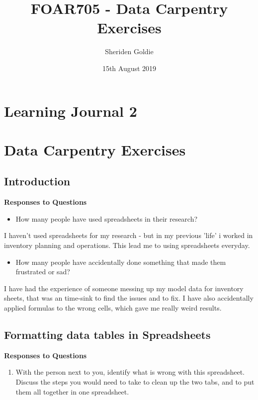 \documentclass{article}
\title{FOAR705 - Data Carpentry Exercises}
\author{Sheriden Goldie}
\date{15th August 2019}
\begin{document}
\maketitle
\section*{Learning Journal 2}
\section{Data Carpentry Exercises}
\subsection{Introduction}
\textbf{Responses to Questions}

\begin{itemize}
    \item How many people have used spreadsheets in their research?
\end{itemize}

I haven't used spreadsheets for my research - but in my previous 'life' i worked in inventory planning and operations. This lead me to using spreadsheets everyday.

\begin{itemize}
    \item How many people have accidentally done something that made them frustrated or sad?
\end{itemize}

I have had the experience of someone messing up my model data for inventory sheets, that was an time-sink to find the issues and to fix. I have also accidentally applied formulas to the wrong cells, which gave me really weird results. 

\subsection{Formatting data tables in Spreadsheets}
\textbf{Responses to Questions}

\begin{enumerate}
    \item With the person next to you, identify what is wrong with this spreadsheet. Discuss the steps you would need to take to clean up the two tabs, and to put them all together in one spreadsheet.
\end{enumerate} 
\end{document}
